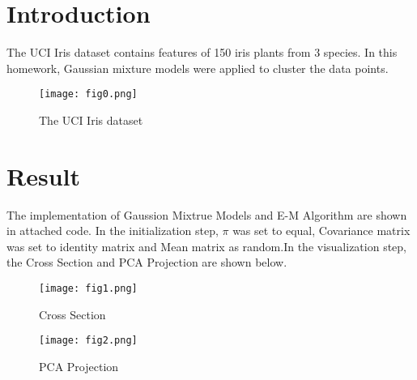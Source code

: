 \section*{Introduction}
The UCI Iris dataset contains features of 150 iris plants from 3 species. In this homework, Gaussian mixture models were applied to cluster the data points.

\begin{figure}[ht]
\centering
\texttt{[image: fig0.png]}
\caption{The UCI Iris dataset}
\label{fig:pathdemo1}
\end{figure}


\section*{Result}
The implementation of Gaussion Mixtrue Models and E-M Algorithm are shown in attached code. In the initialization step, $\pi$ was set to equal, Covariance matrix was set to identity matrix and Mean matrix as random.In the visualization step, the Cross Section and PCA Projection are shown below.
\begin{figure}[ht]
\centering
\texttt{[image: fig1.png]}
\caption{Cross Section}
\label{fig:pathdemo2}
\end{figure}

\begin{figure}[ht]
\centering
\texttt{[image: fig2.png]}
\caption{PCA Projection}
\label{fig:pathdemo3}
\end{figure}

